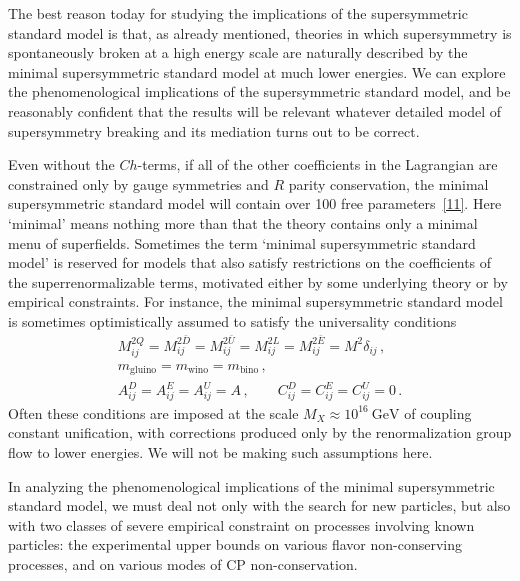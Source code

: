 The best reason today for studying the implications of the supersymmetric
standard model is that, as already mentioned, theories in which
supersymmetry is spontaneously broken at a high energy scale are naturally
described by the minimal supersymmetric standard model at much lower
energies. We can explore the phenomenological implications of the
supersymmetric standard model, and be reasonably confident that the
results will be relevant whatever detailed model of supersymmetry breaking
and its mediation turns out to be correct.

Even without the \(Ch\)-terms, if all of the other coefficients in the
Lagrangian are constrained only by gauge symmetries and \(R\) parity
conservation, the minimal supersymmetric standard model will contain over
100 free parameters~\hyperref[ch28-ref-11]{[11]}. Here `minimal' means
nothing more than that the theory contains only a minimal menu of
superfields. Sometimes the term `minimal supersymmetric standard model' is
reserved for models that also satisfy restrictions on the coefficients of
the superrenormalizable terms, motivated either by some underlying theory
or by empirical constraints. For instance, the minimal supersymmetric
standard model is sometimes optimistically assumed to satisfy the
universality conditions
\begin{equation}
  \begin{gathered}
  M_{ij}^{2Q}=M_{ij}^{2\bar D}=M_{ij}^{2\bar U}
  =M_{ij}^{2L}=M_{ij}^{2\bar E}=M^2\delta_{ij}\,,
  \\
  m_{\mathrm{gluino}}=m_{\mathrm{wino}}=m_{\mathrm{bino}}\,,
  \\
  A_{ij}^{D}=A_{ij}^{E}=A_{ij}^{U}=A\,,
  \qquad
  C_{ij}^{D}=C_{ij}^{E}=C_{ij}^{U}=0\,.
  \end{gathered}
  \tag{28.4.2}\label{eq:28.4.2}
\end{equation}
Often these conditions are imposed at the scale
\(M_X\approx10^{16}\ \mathrm{GeV}\) of coupling constant unification,
with corrections produced only by the renormalization group flow to lower
energies. We will not be making such assumptions here.

In analyzing the phenomenological implications of the minimal
supersymmetric standard model, we must deal not only with the search for
new particles, but also with two classes of severe empirical constraint on
processes involving known particles: the experimental upper bounds on
various flavor non-conserving processes, and on various modes of CP
non-conservation.

